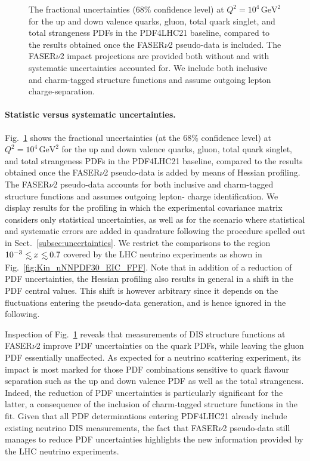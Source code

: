 \begin{figure}[t]
\caption{
The fractional uncertainties (68\% confidence level) at $Q^2 = 10^4 \, \textrm{GeV}^2$ 
for the up and down valence quarks, gluon, total quark singlet, and total strangeness PDFs
in the PDF4LHC21 baseline, compared to the results obtained once the FASER$\nu$2 pseudo-data is included.
%
The FASER$\nu$2 impact projections are provided both without and with systematic
uncertainties accounted for.
%
We include  both  inclusive and charm-tagged structure functions
and assume outgoing lepton charge-separation.
%
}
\label{fig:FASERnu2_baseline}
\end{figure}

\paragraph{Statistic versus systematic uncertainties.}
%
Fig.~\ref{fig:FASERnu2_baseline} shows the
fractional uncertainties (at the 68\% confidence level) at $Q^2 = 10^4 \, \textrm{GeV}^2$ 
for the up and down valence quarks, gluon, total quark singlet, and total strangeness PDFs
in the PDF4LHC21 baseline, compared to the results obtained once the FASER$\nu$2 pseudo-data is added
by means of Hessian profiling.
%
The FASER$\nu$2 pseudo-data accounts for  both  inclusive and charm-tagged structure functions
and assumes outgoing lepton- charge identification.
%
We display results for the profiling in which the experimental covariance matrix
considers only statistical uncertainties, as well as for the scenario where
statistical and systematic errors are added in quadrature following
the procedure spelled out in Sect.~\ref{subsec:uncertainties}.
%
We restrict the comparisons to the region $10^{-3}\lsim x \lsim 0.7$ covered
by the LHC neutrino experiments as shown in Fig.~\ref{fig:Kin_nNNPDF30_EIC_FPF}.
%
Note that in addition of a reduction of PDF uncertainties, the Hessian profiling
also results in general in a shift in the PDF central values.
%
This shift is however arbitrary since it 
depends on the fluctuations
entering the pseudo-data generation, and is hence ignored in the following.

Inspection of Fig.~\ref{fig:FASERnu2_baseline} reveals that measurements of DIS structure
functions at FASER$\nu$2 improve PDF uncertainties on the quark PDFs, while leaving
the gluon PDF essentially unaffected.
%
As expected for a neutrino scattering experiment, its impact is most marked for
those PDF combinations sensitive to quark flavour separation such as
the up and down valence PDF as well as the total strangeness.
%
Indeed, the reduction of PDF uncertainties is particularly significant for the latter,
a consequence of the inclusion of charm-tagged structure functions in the fit.
%
Given that all PDF determinations entering PDF4LHC21 already include existing neutrino
DIS measurements, the fact that FASER$\nu$2 pseudo-data still manages to reduce PDF
uncertainties highlights the new information provided by the LHC neutrino experiments.

